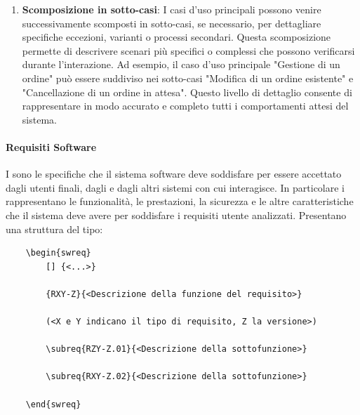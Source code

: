 \begin{enumerate}
    \item \textbf{Scomposizione in sotto-casi}: I casi d'uso principali possono venire successivamente scomposti in sotto-casi, se necessario, per dettagliare specifiche eccezioni, varianti o processi secondari. Questa scomposizione permette di descrivere scenari più specifici o complessi che possono verificarsi durante l'interazione. Ad esempio, il caso d'uso principale "Gestione di un ordine" può essere suddiviso nei sotto-casi "Modifica di un ordine esistente" e "Cancellazione di un ordine in attesa". Questo livello di dettaglio consente di rappresentare in modo accurato e completo tutti i comportamenti attesi del sistema.

\end{enumerate}

\paragraph{Requisiti Software}
\label{par:requisiti_software}
I  sono le specifiche che il sistema software deve soddisfare per essere accettato dagli utenti finali, dagli  e dagli altri sistemi con cui interagisce.
In particolare i  rappresentano le funzionalità, le prestazioni, la sicurezza e le altre caratteristiche che il sistema deve avere per soddisfare i requisiti utente analizzati.
Presentano una struttura del tipo:

\begin{lstlisting}
    \begin{swreq}
        [] {<...>}
        
        {RXY-Z}{<Descrizione della funzione del requisito>}
    
        (<X e Y indicano il tipo di requisito, Z la versione>)

        \subreq{RZY-Z.01}{<Descrizione della sottofunzione>}
    
        \subreq{RXY-Z.02}{<Descrizione della sottofunzione>}
    
    \end{swreq}
\end{lstlisting}